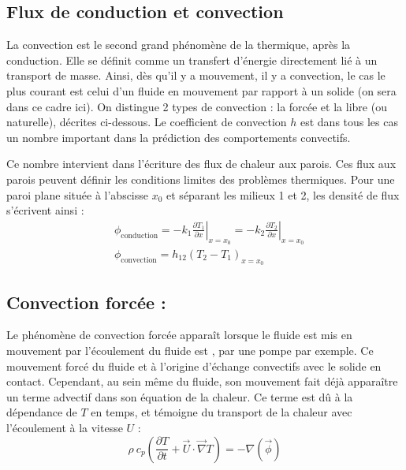 

\subsection{Flux de conduction et convection}
La convection est le second grand phénomène de la thermique, après la conduction. Elle se définit comme un transfert d'énergie directement lié à un transport de masse. Ainsi, dès qu'il y a mouvement, il y a convection, le cas le plus courant est celui d'un fluide en mouvement par rapport à un solide (on sera dans ce cadre ici). On distingue 2 types de convection : la forcée et la libre (ou naturelle), décrites ci-dessous. Le coefficient de convection $h$ est dans tous les cas un nombre important dans la prédiction des comportements convectifs.

Ce nombre intervient dans l'écriture des flux de chaleur aux parois. Ces flux aux parois peuvent définir les conditions limites des problèmes thermiques. Pour une paroi plane située à l'abscisse $x_0$ et séparant les milieux 1 et 2, les densité de flux s'écrivent ainsi :
%
\begin{align}[left=\empheqlbrace]
 &\phi_{\text{conduction}}
 = - k_1 \left. \frac{\partial{T_1}}{\partial{x}} \right|_{x=x_0}
 = - k_2 \left. \frac{\partial{T_2}}{\partial{x}} \right|_{x=x_0} \\
 &\phi_{\text{convection}}
 = h_{12} \left( T_2 - T_1 \right)_{x=x_0}
 \label{eq:fluxth}
\end{align}


\subsection{Convection forcée :}
Le phénomène de convection forcée apparaît lorsque le fluide est mis en mouvement par 
l'écoulement du fluide est , par une pompe par exemple. Ce mouvement forcé du fluide et à l'origine d'échange convectifs avec le solide en contact. Cependant, au sein même du fluide, son mouvement fait déjà apparaître un terme advectif dans son équation de la chaleur. Ce terme est dû à la dépendance de $T$ en temps, et témoigne du transport de la chaleur avec l'écoulement à la vitesse $U$ :
%
\begin{equation}
\rho~c_{p} \left( \frac{\partial T}{\partial t}
+ \vec{U} \cdot \vec{\nabla} T \right)
= - \nabla(\vec{\phi})
\end{equation}

